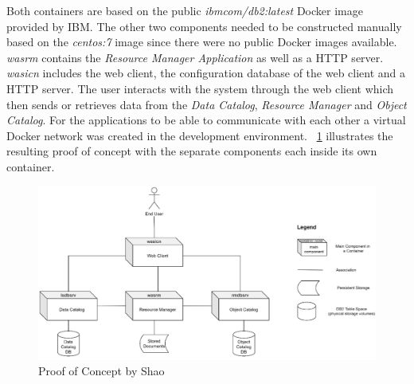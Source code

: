 Both containers are based on the public \textit{ibmcom/db2:latest} Docker image provided by IBM.
The other two components needed to be constructed manually based on the \textit{centos:7} image since there were no public Docker images available.
\textit{wasrm} contains the \textit{Resource Manager Application} as well as a HTTP server.
\textit{wasicn} includes the web client, the configuration database of the web client and a HTTP server.
The user interacts with the system through the web client which then sends or retrieves data from the \textit{Data Catalog}, \textit{Resource Manager} and \textit{Object Catalog}.
For the applications to be able to communicate with each other a virtual Docker network was created in the development environment.
~\cref{fig:gang_system} illustrates the resulting proof of concept with the separate components each inside its own container.
\begin{figure}[h]
    \centering
    \includegraphics[width=\textwidth]{graphics/gang_system.png}
    \caption{Proof of Concept by Shao ~\cite{shao}}
    \label{fig:gang_system}
\end{figure}